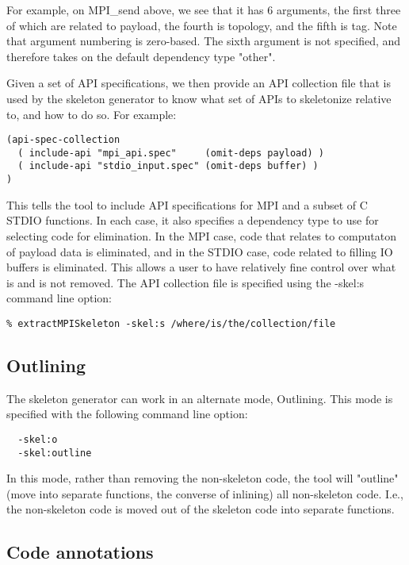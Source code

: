 For example, on MPI_send above, we see that it has 6 arguments, the
first three of which are related to payload, the fourth is topology,
and the fifth is tag.  Note that argument numbering is zero-based.
The sixth argument is not specified, and therefore takes on the
default dependency type "other".

Given a set of API specifications, we then provide an API collection
file that is used by the skeleton generator to know what set of APIs
to skeletonize relative to, and how to do so.  For example:

\begin{verbatim}
(api-spec-collection
  ( include-api "mpi_api.spec"     (omit-deps payload) )
  ( include-api "stdio_input.spec" (omit-deps buffer) )
)
\end{verbatim}

This tells the tool to include API specifications for MPI and a subset
of C STDIO functions.  In each case, it also specifies a dependency
type to use for selecting code for elimination.  In the MPI case, code
that relates to computaton of payload data is eliminated, and in the
STDIO case, code related to filling IO buffers is eliminated.  This
allows a user to have relatively fine control over what is and is not
removed.  The API collection file is specified using the -skel:s
command line option:

\begin{verbatim}
% extractMPISkeleton -skel:s /where/is/the/collection/file
\end{verbatim}

\subsection{Outlining}

The skeleton generator can work in an alternate mode, Outlining.  This mode is
specified with the following command line option:

\begin{verbatim}
  -skel:o
  -skel:outline
\end{verbatim}

In this mode, rather than removing the non-skeleton code, the tool will
"outline" (move into separate functions, the converse of inlining) all
non-skeleton code.  I.e., the non-skeleton code is moved out of the skeleton
code into separate functions.

\subsection{Code annotations}

